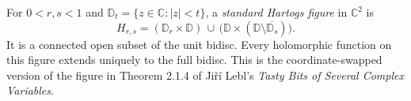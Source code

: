 
For $0<r,s<1$ and $\mathbb D_t=\{z\in\mathbb C:|z|<t\}$, a \emph{standard Hartogs figure} in $\mathbb C^2$ is
\[
H_{r,s}=(\mathbb D_r\times\mathbb D)\,\cup\,\bigl(\mathbb D\times(\mathbb D\setminus\overline{\mathbb D_s})\bigr).
\]
It is a connected open subset of the unit bidisc. Every holomorphic function on this figure extends uniquely to the full bidisc. This is the coordinate-swapped version of the figure in Theorem 2.1.4 of Jiří Lebl's \emph{Tasty Bits of Several Complex Variables}.
